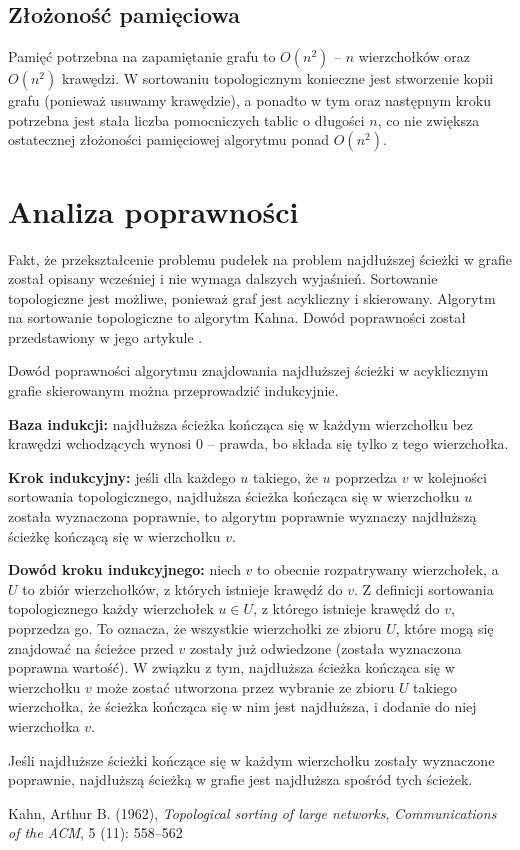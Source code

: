\documentclass{article}
\begin{document}
\subsection{Złożoność pamięciowa}
Pamięć potrzebna na zapamiętanie grafu to $O(n^2)$ -- $n$ wierzchołków oraz $O(n^2)$ krawędzi. W sortowaniu topologicznym konieczne jest stworzenie kopii grafu (ponieważ usuwamy krawędzie), a ponadto w tym oraz następnym kroku potrzebna jest stała liczba pomocniczych tablic o długości $n$, co nie zwiększa ostatecznej złożoności pamięciowej algorytmu ponad $O(n^2)$.
\section{Analiza poprawności}
Fakt, że przekształcenie problemu pudełek na problem najdłuższej ścieżki w grafie został opisany wcześniej i nie wymaga dalszych wyjaśnień. Sortowanie topologiczne jest możliwe, ponieważ graf jest acykliczny i skierowany. Algorytm na sortowanie topologiczne to algorytm Kahna. Dowód poprawności został przedstawiony w jego artykule \cite{Kahn}. 

Dowód poprawności algorytmu znajdowania najdłuższej ścieżki w acyklicznym grafie skierowanym można przeprowadzić indukcyjnie.

\textbf{Baza indukcji:} najdłuższa ścieżka kończąca się w każdym wierzchołku bez krawędzi wchodzących wynosi 0 -- prawda, bo składa się tylko z tego wierzchołka.

\textbf{Krok indukcyjny:} jeśli dla każdego $u$ takiego, że $u$ poprzedza $v$ w kolejności sortowania topologicznego, najdłuższa ścieżka kończąca się w wierzchołku $u$ została wyznaczona poprawnie, to algorytm poprawnie wyznaczy najdłuższą ścieżkę kończącą się w wierzchołku $v$. 

\textbf{Dowód kroku indukcyjnego:} niech $v$ to obecnie rozpatrywany wierzchołek, a $U$ to zbiór wierzchołków, z których istnieje krawędź do $v$. Z definicji sortowania topologicznego każdy wierzchołek $u \in U$, z którego istnieje krawędź do $v$, poprzedza go. To oznacza, że wszystkie wierzchołki ze zbioru $U$, które mogą się znajdować na ścieżce przed $v$ zostały już odwiedzone (została wyznaczona poprawna wartość). W związku z tym, najdłuższa ścieżka kończąca się w wierzchołku $v$ może zostać utworzona przez wybranie ze zbioru $U$ takiego wierzchołka, że ścieżka kończąca się w nim jest najdłuższa, i dodanie do niej wierzchołka $v$.

Jeśli najdłuższe ścieżki kończące się w każdym wierzchołku zostały wyznaczone poprawnie, najdłuższą ścieżką w grafie jest najdłuższa spośród tych ścieżek.

\begin{thebibliography}{20}
Kahn, Arthur B. (1962), \textit{Topological sorting of large networks}, \textit{Communications of the ACM}, 5 (11): 558–562
\end{thebibliography}
\end{document}
